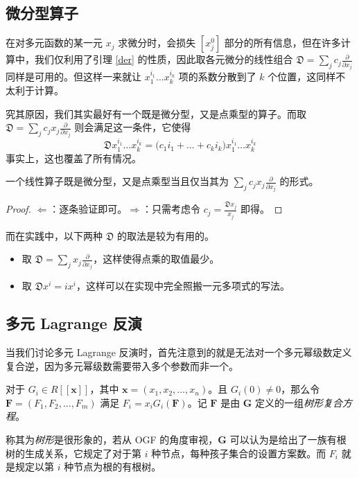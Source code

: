 \subsection{微分型算子}

在对多元函数的某一元 $x_j$ 求微分时，会损失 $[x_j^0]$ 部分的所有信息，但在许多计算中，我们仅利用了引理 \ref{der} 的性质，因此取各元微分的线性组合 $\mathfrak D=\sum_j c_j \frac{\partial}{\partial x_j}$ 同样是可用的。但这样一来就让 $x_1^{i_1}\dots x_k^{i_k}$ 项的系数分散到了 $k$ 个位置，这同样不太利于计算。

究其原因，我们其实最好有一个既是微分型，又是点乘型的算子。而取 $\mathfrak D=\sum_j c_j x_j\frac{\partial}{\partial x_j}$ 则会满足这一条件，它使得
$$
\mathfrak D x_1^{i_1}\dots x_k^{i_k} = \mathfrak (c_1i_1+\dots+c_ki_k)x_1^{i_1}\dots x_k^{i_k}
$$
事实上，这也覆盖了所有情况。
\begin{lemma}
一个线性算子既是微分型，又是点乘型当且仅当其为 $\sum_j c_j x_j\frac{\partial}{\partial x_j}$ 的形式。
\end{lemma}
\begin{proof}
$\Leftarrow$：逐条验证即可。$\Rightarrow$：只需考虑令 $c_j = \frac{\mathfrak D x_j}{x_j}$ 即得。
\end{proof}
而在实践中，以下两种 $\mathfrak D$ 的取法是较为有用的。
\begin{itemize}
\item 取 $\mathfrak D=\sum_j x_j\frac{\partial}{\partial x_j}$，这样使得点乘的取值最少。
\item 取 $\mathfrak D x^i = ix^i$，这样可以在实现中完全照搬一元多项式的写法。
\end{itemize}

\subsection{多元 Lagrange 反演}

当我们讨论多元 Lagrange 反演时，首先注意到的就是无法对一个多元幂级数定义复合逆，因为多元幂级数需要带入多个参数而非一个。

\begin{definition}[树形复合方程]
对于 $G_i \in R[[\mathbf x]]$，其中 $\mathbf x = (x_1, x_2, \dots, x_n)$。且 $G_i(0) \neq 0$，那么令 $\mathbf F = (F_1, F_2, \dots, F_m)$ 满足 $F_i = x_i G_i (\mathbf F)$。记 $\mathbf F$ 是由 $\mathbf G$ 定义的一组\emph{树形复合方程}。
\end{definition}

称其为\emph{树形}是很形象的，若从 OGF 的角度审视，$\mathbf G$ 可以认为是给出了一族有根树的生成关系，它规定了对于第 $i$ 种节点，每种孩子集合的设置方案数。而 $F_i$ 就是规定以第 $i$ 种节点为根的有根树。

